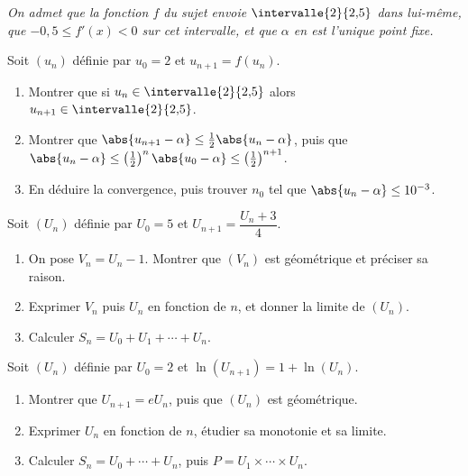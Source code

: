 \begin{annales}
\emph{On admet que la fonction $f$ du sujet envoie $\intervalle{2}{2{,}5}$
dans lui-même, que $-0{,}5 \leq f'(x) < 0$ sur cet intervalle, et que $\alpha$
en est l'unique point fixe.}

Soit $(u_{n})$ définie par $u_{0} = 2$ et $u_{n+1} = f(u_{n})$.
\begin{enumerate}[label=\textbf{\alph*)}, leftmargin=*, itemsep=0.15em]
  \item Montrer que si $u_{n} \in \intervalle{2}{2{,}5}$ alors
        $u_{n+1} \in \intervalle{2}{2{,}5}$.
  \item Montrer que $\abs{u_{n+1}-\alpha} \leq \frac12\abs{u_{n}-\alpha}$,
        puis que $\abs{u_{n}-\alpha} \leq
        \left(\frac12\right)^{n}\abs{u_{0}-\alpha} \leq
        \left(\frac12\right)^{n+1}$.
  \item En déduire la convergence, puis trouver $n_{0}$ tel que
        $\abs{u_{n}-\alpha} \leq 10^{-3}$.
\end{enumerate}

Soit $(U_{n})$ définie par $U_{0} = 5$ et
$U_{n+1} = \dfrac{U_{n}+3}{4}$.
\begin{enumerate}[label=\textbf{\alph*)}, leftmargin=*, itemsep=0.15em]
  \item On pose $V_{n} = U_{n}-1$. Montrer que $(V_{n})$ est géométrique et
        préciser sa raison.
  \item Exprimer $V_{n}$ puis $U_{n}$ en fonction de $n$, et donner la limite
        de $(U_{n})$.
  \item Calculer $S_{n} = U_{0}+U_{1}+\cdots+U_{n}$.
\end{enumerate}

Soit $(U_{n})$ définie par $U_{0} = 2$ et
$\ln\!\left(U_{n+1}\right) = 1+\ln\!\left(U_{n}\right)$.
\begin{enumerate}[label=\textbf{\alph*)}, leftmargin=*, itemsep=0.15em]
  \item Montrer que $U_{n+1} = eU_{n}$, puis que $(U_{n})$ est géométrique.
  \item Exprimer $U_{n}$ en fonction de $n$, étudier sa monotonie et sa
        limite.
  \item Calculer $S_{n} = U_{0}+\cdots+U_{n}$, puis
        $P = U_{1}\times\cdots\times U_{n}$.
\end{enumerate}


\end{annales}
